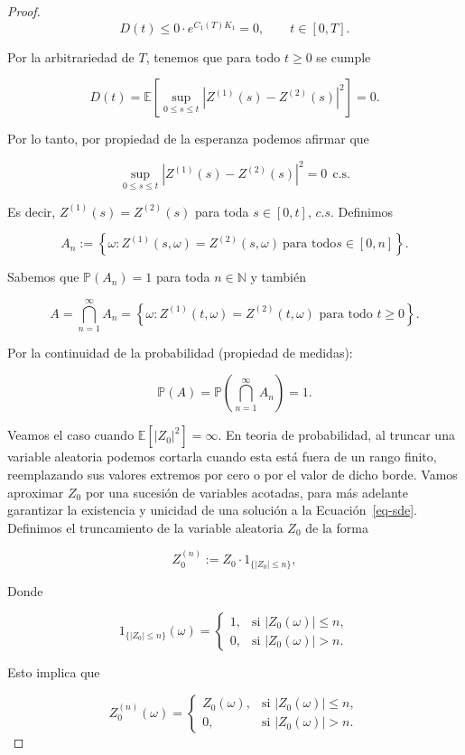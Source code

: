 \documentclass[
  spanish,
  us-letterpaper,
]{scrreprt}
\theoremstyle{plain}
\theoremstyle{plain}
\theoremstyle{plain}
\theoremstyle{definition}
\theoremstyle{remark}
\begin{document}
\begin{proof}
\[
    D(t) \leq 0\cdot e^{C_1(T)K_1}=0, \qquad t\in [0,T].
\]

Por la arbitrariedad de \(T\), tenemos que para todo \(t\geq 0\) se
cumple

\[
    D(t)=\mathbb{E}\left[\sup\limits_{0\leq s\leq t}\left|Z^{(1)}(s) - Z^{(2)}(s)\right|^2\right]=0.
\]

Por lo tanto, por propiedad de la esperanza podemos afirmar que

\[
\sup\limits_{0\leq s\leq t}\left|Z^{(1)}(s) - Z^{(2)}(s)\right|^2=0\ \ \text{c.s.}
\]

Es decir, \(Z^{(1)}(s)=Z^{(2)}(s)\) para toda \(s\in [0,t]\), \(c.s\).
Definimos

\[
A_n:=\left\{\omega: Z^{(1)}(s,\omega)=Z^{(2)}(s,\omega)\ \text{para todo} s\in [0,n]\right\}.
\]

Sabemos que \(\mathbb{P}(A_n)=1\) para toda \(n\in \mathbb{N}\) y
también

\[
    A = \bigcap_{n=1}^\infty A_n = \left\{ \omega : Z^{(1)}(t,\omega) = Z^{(2)}(t,\omega) \text{ para todo } t \geq 0 \right\}.
\]

Por la continuidad de la probabilidad (propiedad de medidas):

\[
\mathbb{P}(A) = \mathbb{P}\left( \bigcap_{n=1}^\infty A_n \right) = 1.
\]

Veamos el caso cuando \(\mathbb{E}[|Z_0|^2]=\infty\). En teoria de
probabilidad, al truncar una variable aleatoria podemos cortarla cuando
esta está fuera de un rango finito, reemplazando sus valores extremos
por cero o por el valor de dicho borde. Vamos aproximar \(Z_0\) por una
sucesión de variables acotadas, para más adelante garantizar la
existencia y unicidad de una solución a la Ecuación~\ref{eq-sde}.
Definimos el truncamiento de la variable aleatoria \(Z_0\) de la forma

\[
    Z_0^{(n)}:=Z_0\cdot 1_{\{|Z_0|\leq n\}},
\]

Donde

\[
1_{\{ |Z_0| \leq n \}}(\omega) =
\begin{cases}
1, & \text{si } |Z_0(\omega)| \leq n, \\
0, & \text{si } |Z_0(\omega)| > n.
\end{cases}
\]

Esto implica que

\[
    Z_0^{(n)}(\omega) = 
    \begin{cases}
    Z_0(\omega), & \text{si } |Z_0(\omega)| \leq n, \\ 
    0, & \text{si } |Z_0(\omega)| > n.
    \end{cases}
\]


\end{proof}
\end{document}
